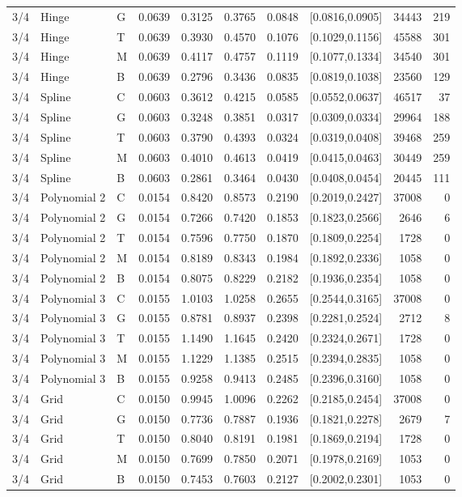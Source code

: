 \begin{longtable}{lllrrrrlrr}
3/4 & Hinge & G & 0.0639 & 0.3125 & 0.3765 & 0.0848 & [0.0816,0.0905] & 34443 & 219 \\
3/4 & Hinge & T & 0.0639 & 0.3930 & 0.4570 & 0.1076 & [0.1029,0.1156] & 45588 & 301 \\
3/4 & Hinge & M & 0.0639 & 0.4117 & 0.4757 & 0.1119 & [0.1077,0.1334] & 34540 & 301 \\
3/4 & Hinge & B & 0.0639 & 0.2796 & 0.3436 & 0.0835 & [0.0819,0.1038] & 23560 & 129 \\
3/4 & Spline & C & 0.0603 & 0.3612 & 0.4215 & 0.0585 & [0.0552,0.0637] & 46517 & 37 \\
3/4 & Spline & G & 0.0603 & 0.3248 & 0.3851 & 0.0317 & [0.0309,0.0334] & 29964 & 188 \\
3/4 & Spline & T & 0.0603 & 0.3790 & 0.4393 & 0.0324 & [0.0319,0.0408] & 39468 & 259 \\
3/4 & Spline & M & 0.0603 & 0.4010 & 0.4613 & 0.0419 & [0.0415,0.0463] & 30449 & 259 \\
3/4 & Spline & B & 0.0603 & 0.2861 & 0.3464 & 0.0430 & [0.0408,0.0454] & 20445 & 111 \\
3/4 & Polynomial 2 & C & 0.0154 & 0.8420 & 0.8573 & 0.2190 & [0.2019,0.2427] & 37008 & 0 \\
3/4 & Polynomial 2 & G & 0.0154 & 0.7266 & 0.7420 & 0.1853 & [0.1823,0.2566] & 2646 & 6 \\
3/4 & Polynomial 2 & T & 0.0154 & 0.7596 & 0.7750 & 0.1870 & [0.1809,0.2254] & 1728 & 0 \\
3/4 & Polynomial 2 & M & 0.0154 & 0.8189 & 0.8343 & 0.1984 & [0.1892,0.2336] & 1058 & 0 \\
3/4 & Polynomial 2 & B & 0.0154 & 0.8075 & 0.8229 & 0.2182 & [0.1936,0.2354] & 1058 & 0 \\
3/4 & Polynomial 3 & C & 0.0155 & 1.0103 & 1.0258 & 0.2655 & [0.2544,0.3165] & 37008 & 0 \\
3/4 & Polynomial 3 & G & 0.0155 & 0.8781 & 0.8937 & 0.2398 & [0.2281,0.2524] & 2712 & 8 \\
3/4 & Polynomial 3 & T & 0.0155 & 1.1490 & 1.1645 & 0.2420 & [0.2324,0.2671] & 1728 & 0 \\
3/4 & Polynomial 3 & M & 0.0155 & 1.1229 & 1.1385 & 0.2515 & [0.2394,0.2835] & 1058 & 0 \\
3/4 & Polynomial 3 & B & 0.0155 & 0.9258 & 0.9413 & 0.2485 & [0.2396,0.3160] & 1058 & 0 \\
3/4 & Grid & C & 0.0150 & 0.9945 & 1.0096 & 0.2262 & [0.2185,0.2454] & 37008 & 0 \\
3/4 & Grid & G & 0.0150 & 0.7736 & 0.7887 & 0.1936 & [0.1821,0.2278] & 2679 & 7 \\
3/4 & Grid & T & 0.0150 & 0.8040 & 0.8191 & 0.1981 & [0.1869,0.2194] & 1728 & 0 \\
3/4 & Grid & M & 0.0150 & 0.7699 & 0.7850 & 0.2071 & [0.1978,0.2169] & 1053 & 0 \\
3/4 & Grid & B & 0.0150 & 0.7453 & 0.7603 & 0.2127 & [0.2002,0.2301] & 1053 & 0 \\
\end{longtable}
